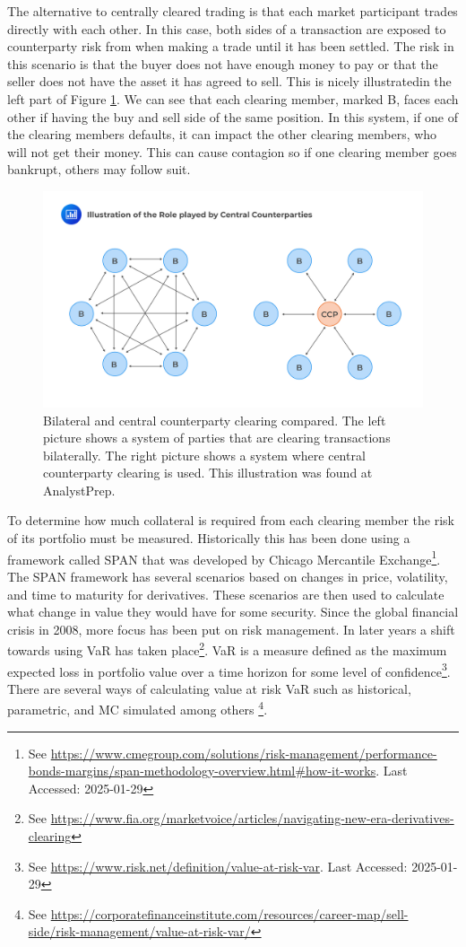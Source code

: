 The alternative to centrally cleared trading is that each market participant trades directly with each other. In this case, both sides of a transaction are exposed to counterparty risk from when making a trade until it has been settled. The risk in this scenario is that the buyer does not have enough money to pay or that the seller does not have the asset it has agreed to sell. This is nicely illustrated\footnotemark[\value{footnote}] in the left part of Figure \ref{fig:CCP}. We can see that each clearing member, marked B, faces each other if having the buy and sell side of the same position. In this system, if one of the clearing members defaults, it can impact the other clearing members, who will not get their money. This can cause contagion so if one clearing member goes bankrupt, others may follow suit. 

\begin{figure}[ht]
    \centering
    \includegraphics[width=0.7\linewidth]{1Introduction/pictures/CCPvisual .jpg}
    \caption{Bilateral and central counterparty clearing compared. The left picture shows a system of parties that are clearing transactions bilaterally. The right picture shows a system where central counterparty clearing is used. This illustration was found at AnalystPrep\protect\footnotemark[\value{footnote}]. }
    \label{fig:CCP}
\end{figure}

To determine how much collateral is required from each clearing member the risk of its portfolio must be measured. Historically this has been done using a framework called \gls{SPAN} that was developed by Chicago Mercantile Exchange\footnote{See \url{https://www.cmegroup.com/solutions/risk-management/performance-bonds-margins/span-methodology-overview.html\#how-it-works}.  Last Accessed: 2025-01-29}. The \gls{SPAN} framework has several scenarios based on changes in price, volatility, and time to maturity for derivatives. These scenarios are then used to calculate what change in value they would have for some security. Since the global financial crisis in 2008, more focus has been put on risk management. In later years a shift towards using \gls{VaR} has taken place\footnote{See \url{https://www.fia.org/marketvoice/articles/navigating-new-era-derivatives-clearing}}. \gls{VaR} is a measure defined as the maximum expected loss in portfolio value over a time horizon for some level of confidence\footnote{See \url{https://www.risk.net/definition/value-at-risk-var}. Last Accessed: 2025-01-29}. There are several ways of calculating value at risk \gls{VaR} such as historical, parametric, and \gls{MC} simulated among others \footnote{See \url{https://corporatefinanceinstitute.com/resources/career-map/sell-side/risk-management/value-at-risk-var/}}.  

